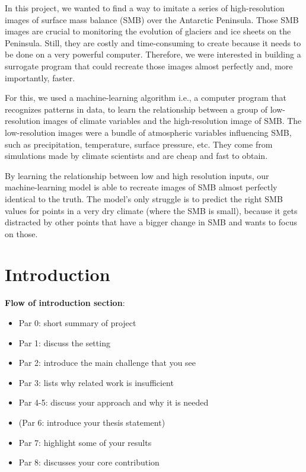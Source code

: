 \documentclass[a4paper,11pt,oneside]{report}
\begin{document}
\begin{plainlanguage}
In this project, we wanted to find a way to imitate a series of high-resolution images of surface mass balance (SMB) over the Antarctic Peninsula. Those SMB images are crucial to monitoring the evolution of glaciers and ice sheets on the Peninsula. Still, they are costly and time-consuming to create because it needs to be done on a very powerful computer. Therefore, we were interested in building a surrogate program that could recreate those images almost perfectly and, more importantly, faster. 

For this, we used a machine-learning algorithm i.e., a computer program that recognizes patterns in data, to learn the relationship between a group of low-resolution images of climate variables and the high-resolution image of SMB. The low-resolution images were a bundle of atmospheric variables influencing SMB, such as precipitation, temperature, surface pressure, etc. They come from simulations made by climate scientists and are cheap and fast to obtain. 

By learning the relationship between low and high resolution inputs, our machine-learning model is able to recreate images of SMB almost perfectly identical to the truth. The model's only struggle is to predict the right SMB values for points in a very dry climate (where the SMB is small), because it gets distracted by other points that have a bigger change in SMB and wants to focus on those. 



\end{plainlanguage}

\maketoc

\chapter{Introduction}

\textbf{Flow of introduction section}:
\begin{itemize}
    \item Par 0: short summary of project
    \item Par 1: discuss the setting
    \item Par 2: introduce the main challenge that you see
    \item Par 3: lists why related work is insufficient
    \item Par 4-5: discuss your approach and why it is needed
    \item (Par 6: introduce your thesis statement)
    \item Par 7: highlight some of your results
    \item Par 8: discusses your core contribution
\end{itemize}
 
\end{document}
